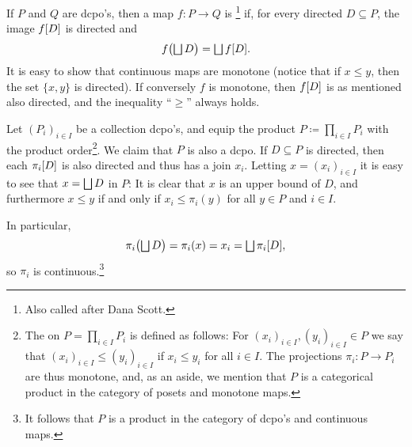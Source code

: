 \documentclass[a4paper, 11pt, article, danish, oneside]{memoir}
\DeclarePairedDelimiter{\auxdelimparen}{(}{)}
\DeclarePairedDelimiter{\auxdelimbracket}{[}{]}
\DeclareMathOperator*{\smallbigsqcup}{\textstyle\bigsqcup}
\DeclareMathOperator*{\bigdjoin}{\mathchoice
    {\smallbigsqcup}%
    {\bigsqcup}%
    {\bigsqcup}%
    {\bigsqcup}%
}
\newcommand{\defeq}{\coloneqq}
\newcommand{\image}[2][]{\auxdelimbracket[#1]{#2}}
\let\oldprod\prod
\renewcommand{\prod}{\times}
\newcommand{\bigprod}{\oldprod}
\begin{document}
If $P$ and $Q$ are dcpo's, then a map $f \colon P \to Q$ is \footnote{Also called  after Dana Scott.} if, for every directed $D \subseteq P$, the image $f\image{D}$ is directed and
%
\begin{equation*}
    f \bigl( \bigdjoin D \bigr)
        = \bigdjoin f\image{D}.
\end{equation*}
%
It is easy to show that continuous maps are monotone (notice that if $x \leq y$, then the set $\{x,y\}$ is directed). If conversely $f$ is monotone, then $f\image{D}$ is as mentioned also directed, and the inequality \enquote{$\geq$} always holds.



\begin{examplebreak}
    Let $(P_i)_{i \in I}$ be a collection dcpo's, and equip the product $P \defeq \bigprod_{i \in I} P_i$ with the product order\footnote{The  on $P = \bigprod_{i \in I} P_i$ is defined as follows: For $(x_i)_{i \in I}, (y_i)_{i \in I} \in P$ we say that $(x_i)_{i \in I} \leq (y_i)_{i \in I}$ if $x_i \leq y_i$ for all $i \in I$. The projections $\pi_i \colon P \to P_i$ are thus monotone, and, as an aside, we mention that $P$ is a categorical product in the category of posets and monotone maps.}. We claim that $P$ is also a dcpo. If $D \subseteq P$ is directed, then each $\pi_i\image{D}$ is also directed and thus has a join $x_i$. Letting $x = (x_i)_{i \in I}$ it is easy to see that $x = \bigdjoin D$ in $P$: It is clear that $x$ is an upper bound of $D$, and furthermore $x \leq y$ if and only if $x_i \leq \pi_i(y)$ for all $y \in P$ and $i \in I$.

    In particular,
    \begin{equation*}
        \pi_i \bigl( \bigdjoin D \bigr)
            = \pi_i(x)
            = x_i
            = \bigdjoin \pi_i\image{D},
    \end{equation*}
    so $\pi_i$ is continuous.\footnote{It follows that $P$ is a product in the category of dcpo's and continuous maps.}
\end{examplebreak}
\end{document}
